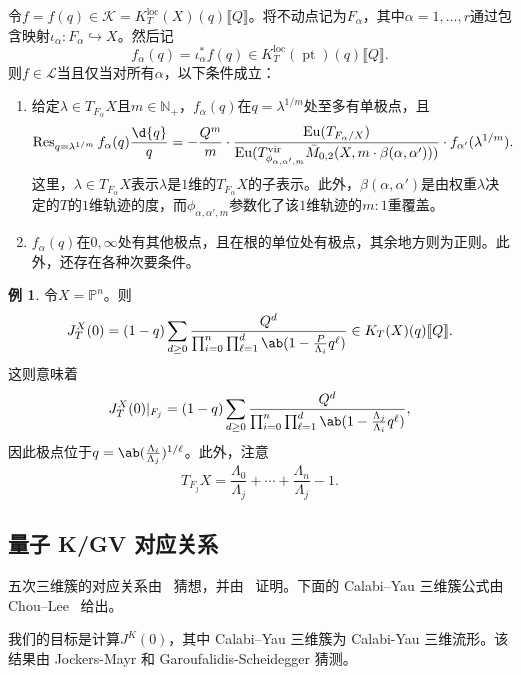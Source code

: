 \documentclass{amsart}
\theoremstyle{definition}
\newtheorem{exm}[thm]{例}
\theoremstyle{remark}
\theoremstyle{plain}
\theoremstyle{definition}
\theoremstyle{remark}
\newcommand{\N}{\mathbb{N}}
\renewcommand{\P}{\mathbb{P}}
\newcommand{\mc}[1]{\mathcal{#1}}
\newcommand{\mr}[1]{\mathrm{#1}}
\newcommand{\on}[1]{\operatorname{#1}}
\newcommand{\1}{\mathbf{1}}
\newcommand{\2}{\mathbf{2}}
\newcommand{\3}{\mathbf{3}}
\newcommand{\vir}{\mr{vir}}
\newcommand{\ps}[1]{\llbracket #1 \rrbracket}
\newcommand{\loc}{\mr{loc}}
\begin{document}
令\(f = f(q) \in \mc{K} = K_T^{\loc}(X)(q)\ps{Q}\)。将不动点记为\(F_{\alpha}\)，其中\(\alpha = 1, \ldots, r\)通过包含映射\(\iota_{\alpha} \colon F_{\alpha} \hookrightarrow X\)。然后记
\[ f_{\alpha}(q) = \iota_{\alpha}^* f(q) \in K_T^{\loc}(\on{pt})(q)\ps{Q}. \]
则\(f \in \mc{L}\)当且仅当对所有\(\alpha\)，以下条件成立：
\begin{enumerate}
    \item 给定\(\lambda \in T_{F_{\alpha}} X\)且\(m \in \N_+\)，\(f_{\alpha}(q)\)在\(q = \lambda^{1/m}\)处至多有单极点，且
        \[ \on{Res}_{q = \lambda^{1/m}} f_{\alpha}(q) \frac{\d{q}}{q} = -\frac{Q^m}{m} \cdot \frac{\on{Eu}(T_{F_{\alpha}/X})}{\on{Eu}(T^{\vir}_{\phi_{\alpha,\alpha',m}}\bar{M}_{0,2}(X, m \cdot \beta(\alpha, \alpha')))} \cdot f_{\alpha'}(\lambda^{1/m}). \]
        这里，\(\lambda \in T_{F_{\alpha}}X\)表示\(\lambda\)是\(1\)维的\(T_{F_{\alpha}} X\)的子表示。此外，\(\beta(\alpha,\alpha')\)是由权重\(\lambda\)决定的\(T\)的\(1\)维轨迹的度，而\(\phi_{\alpha, \alpha', m}\)参数化了该\(1\)维轨迹的\(m:1\)重覆盖。
    \item \(f_{\alpha}(q)\)在\(0, \infty\)处有其他极点，且在根的单位处有极点，其余地方则为正则。此外，还存在各种次要条件。
\end{enumerate}

\begin{exm}
    令\(X = \P^n\)。则
    \[ J_T^X(0) = (1-q) \sum_{d \geq 0} \frac{Q^d}{\prod_{i=0}^n \prod_{\ell = 1}^d \ab(1 - \frac{P}{\Lambda_i} q^{\ell})} \in K_T(X)(q) \ps{Q}. \]
    这则意味着
    \[ J_T^X(0) |_{F_j} = (1-q) \sum_{d \geq 0} \frac{Q^d}{\prod_{i=0}^n \prod_{\ell = 1}^d \ab(1 - \frac{\Lambda_j}{\Lambda_i}q^{\ell})}, \]
    因此极点位于\(q = \ab(\frac{\Lambda_i}{\Lambda_j})^{1/\ell}\)。此外，注意
    \[ T_{F_j} X = \frac{\Lambda_0}{\Lambda_j} + \cdots + \frac{\Lambda_n}{\Lambda_j} - 1. \]
\end{exm}

\subsection{量子 K/GV 对应关系}%
\label{sub:Quantum K/GV correspondence}

五次三维簇的对应关系由~\cite{GaroufalidisScheidegger2022} 猜想，并由~\cite{ChouLeeQuintic} 证明。下面的 Calabi--Yau 三维簇公式由 Chou--Lee~\cite{ChouLee2025} 给出。

我们的目标是计算\(J^K(0)\)，其中 Calabi--Yau 三维簇为 Calabi-Yau 三维流形。该结果由 Jockers-Mayr 和 Garoufalidis-Scheidegger 猜测。
\end{document}
